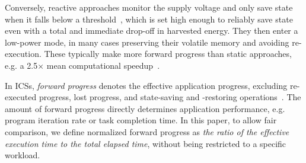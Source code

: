 Conversely, reactive approaches monitor the supply voltage and only save state when it falls below a threshold~\cite{balsamo2016hibernus++, 7849206, 7807254}, which is set high enough to reliably save state even with a total and immediate drop-off in harvested energy. They then enter a low-power mode, in many cases preserving their volatile memory and avoiding re-execution. These typically make more forward progress than static approaches, e.g. a 2.5$\times$ mean computational speedup~\cite{Maeng:2019:SPI:3314221.3314613}. 



In ICSs, \textit{forward progress} denotes the effective application progress, excluding re-executed progress, lost progress, and state-saving and -restoring operations~\cite{7478428}. The amount of forward progress directly determines application performance, e.g. program iteration rate or task completion time. In this paper, to allow fair comparison, we define normalized forward progress as \textit{the ratio of the effective execution time to the total elapsed time}, without being restricted to a specific workload. 

